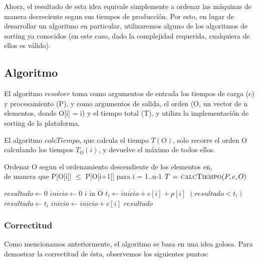 Ahora, el resultado de esta idea equivale simplemente a ordenar las m\'aquinas de manera decreciente segun sus tiempos de producci\'on. Por esto, en lugar de desarrollar un algoritmo en particular, utilizaremos alguno de los algoritmos de sorting ya conocidos (en este caso, dado la complejidad requerida, cualquiera de ellos es v\'alido).

\subsection{Algoritmo}
 
El algoritmo $resolver$ toma como argumentos de entrada los tiempos de carga (c) y procesamiento (P), y como argumentos de salida,
el orden (O, un vector de n elementos, donde O[i] = i) y el tiempo total (T), y utiliza la implementaci\'on
de sorting de la plataforma. 

El algoritmo $calcTiempo$, que calcula el tiempo $T(O)$, solo recorre el orden O
calculando los tiempos $T_{O}(i)$, y devuelve el m\'aximo de todos ellos. 


\begin{algorithm}[H]
\caption{}
\begin{codebox}
\li Ordenar O segun el ordenamiento descendiente de los elementos en, \\
 			de manera que P[O[i]] $\leq$ P[O[i+1]] para i = 1..n-1
\li $T  \mathrel{\hspace{1pt}=\hspace{1pt}} \textnormal{\scshape calcTiempo}(P, c, O)$
\End
\end{codebox}
\end{algorithm}

\begin{algorithm}[H]
\caption{} 
\begin{codebox}
\li $resultado \gets 0$
\li $inicio \gets 0$
\li \For $i$ in O\Do
\li   $t_i \gets inicio + c[i] + p[i]$ 	
\li  	\If $(resultado < t_i)$ \Do
\li 		$resultado \gets t_i$		
 		\End
\li		$inicio \gets inicio  + c[i]$ 		
 	\End	
\li \Return $resultado $
\End
\end{codebox}
\end{algorithm}

\subsubsection{Correctitud} 

Como mencionamos anteriormente, el algoritmo se basa en una idea golosa. Para demostrar la correctitud de \'esta, observemos los siguientes puntos:
 
